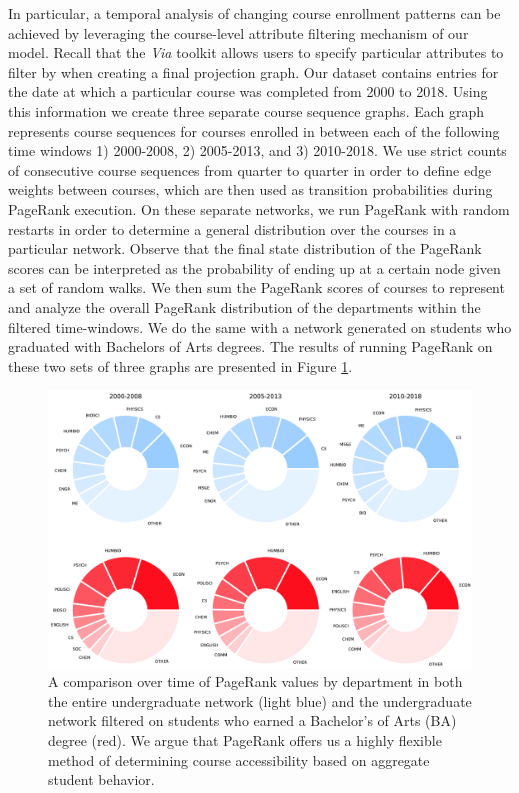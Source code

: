 \documentclass{sigchi}
\begin{document}
In particular, a temporal analysis of changing course enrollment patterns can be achieved by leveraging the course-level attribute filtering mechanism of our model. Recall that the \textit{Via} toolkit allows users to specify particular attributes to filter by when creating a final projection graph. Our dataset contains entries for the date at which a particular course was completed from 2000 to 2018. Using this information we create three separate course sequence graphs. Each graph represents course sequences for courses enrolled in between each of the following time windows 1) 2000-2008, 2) 2005-2013, and 3) 2010-2018. We use strict counts of consecutive course sequences from quarter to quarter in order to define edge weights between courses, which are then used as transition probabilities during PageRank execution.  On these separate networks, we run PageRank with random restarts in order to determine a general distribution over the courses in a particular network. Observe that the final state distribution of the PageRank scores can be interpreted as the probability of ending up at a certain node given a set of random walks. We then sum the PageRank scores of courses to represent and analyze the overall PageRank distribution of the departments within the filtered time-windows. We do the same with a network generated on students who graduated with Bachelors of Arts degrees. The results of running PageRank on these two sets of three graphs are presented in Figure \ref{fig:evolution}.

\begin{figure}
    \centering
    \includegraphics[width=\columnwidth]{final-evolution.pdf}
    \caption{A comparison over time of PageRank values by department in both the entire undergraduate network (light blue) and the undergraduate network filtered on students who earned a Bachelor's of Arts (BA) degree (red). We argue that PageRank offers us a highly flexible method of determining course accessibility based on aggregate student behavior.}
    \label{fig:evolution}
\end{figure}
\end{document}
